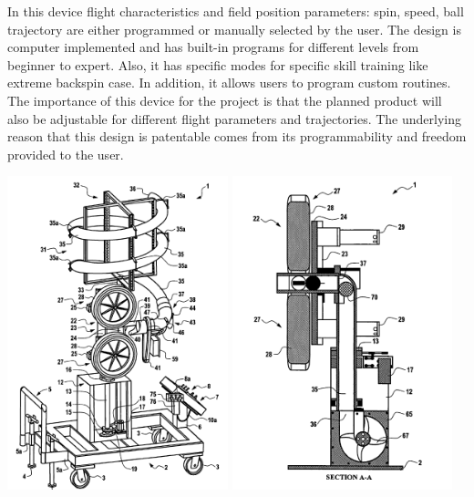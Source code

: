 \documentclass[12pt]{report}
\begin{document}
\begin{minipage}{0.6\textwidth}  %
    In this device flight characteristics and field position parameters: spin, speed, ball trajectory are either programmed or manually selected by the user. The design is computer implemented and has built-in programs for different levels from beginner to expert. Also, it has specific modes for specific skill training like extreme backspin case. In addition, it allows users to program custom routines. The importance of this device for the project is that the planned product will also be adjustable for different flight parameters and trajectories. The underlying reason that this design is patentable comes from its programmability and freedom provided to the user.
\end{minipage}%
\hfill
\begin{minipage}{0.38\textwidth}  %
    \centering
    \includegraphics[width=0.48\textwidth]{figures/patent4-1.png}  %
    \hfill
    \includegraphics[width=0.48\textwidth]{figures/patent4-2.png}  %
    \label{fig:patent4-1}
\end{minipage}
\end{document}
